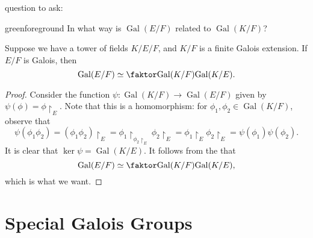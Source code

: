 \documentclass[notoc,notitlepage,nobib]{tufte-book}
\DeclareMathOperator{\Gal}{Gal}
\begin{document}
 question to ask:
\begin{quotebox}{green}{foreground}
  In what way is $\Gal(E / F)$ related to $\Gal(K / F)$?
\end{quotebox}

\begin{propo}\label{propo:first_isomorphism_theorem_on_galois_groups}
  Suppose we have a tower of fields $K / E / F$, and $K / F$ is a finite Galois
  extension. If $E / F$ is Galois, then
  \begin{equation*}
    \Gal(E / F) \simeq \quotient{\Gal(K / F)}{\Gal(K / E)}.
  \end{equation*}
\end{propo}

\begin{proof}
  Consider the function $\psi : \Gal(K / F) \to \Gal(E / F)$ given by
  $\psi(\phi) = \phi \restriction_E$. Note that this is a homomorphism: for
  $\phi_1, \phi_2 \in \Gal(K / F)$, observe that
  \begin{equation*}
    \psi(\phi_1 \phi_2) = (\phi_1 \phi_2) \restriction_E = \phi_1
    \restriction_{\phi_2 \restriction_E} \phi_2 \restriction_E = \phi_1
    \restriction_E \phi_2 \restriction_E = \psi(\phi_1) \psi(\phi_2).
  \end{equation*}
  It is clear that $\ker \psi = \Gal(K / E)$. It follows from the  that
  \begin{equation*}
    \Gal(E / F) \simeq \quotient{\Gal(K / F)}{\Gal(K / E)},
  \end{equation*}
  which is what we want.
\end{proof}


\section{Special Galois Groups}%
\label{sec:special_galois_groups}
\end{document}
